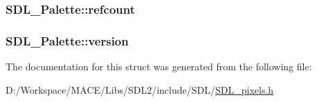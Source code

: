 \subsubsection[{\texorpdfstring{refcount}{refcount}}]{ S\+D\+L\+\_\+\+Palette\+::refcount}\hypertarget{struct_s_d_l___palette_a35c667737f883f973bb0a8dea143b08d}{}\label{struct_s_d_l___palette_a35c667737f883f973bb0a8dea143b08d}
\subsubsection[{\texorpdfstring{version}{version}}]{ S\+D\+L\+\_\+\+Palette\+::version}\hypertarget{struct_s_d_l___palette_a5b8d45519f6850a32f13f1602ce37a8e}{}\label{struct_s_d_l___palette_a5b8d45519f6850a32f13f1602ce37a8e}


The documentation for this struct was generated from the following file\+:\begin{DoxyCompactItemize}
\item 
D\+:/\+Workspace/\+M\+A\+C\+E/\+Libs/\+S\+D\+L2/include/\+S\+D\+L/\hyperlink{_s_d_l__pixels_8h}{S\+D\+L\+\_\+pixels.\+h}\end{DoxyCompactItemize}
